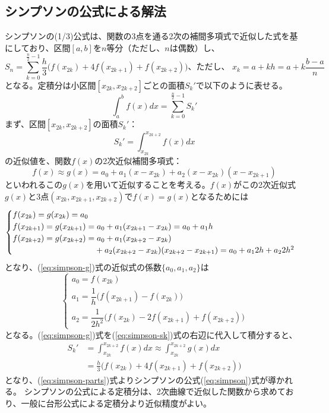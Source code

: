 \documentclass[12pt,a4paper]{ltjsreport}
\begin{document}
\subsection{シンプソンの公式による解法}
シンプソンの(1/3)公式は、関数の3点を通る2次の補間多項式で近似した式を基にしており、区間$[a,b]$を$n$等分（ただし、$n$は偶数）し、
\begin{equation}\label{eq:simpson}
S_n = \sum_{k=0}^{\frac{n}{2}-1}\frac{h}{3}\bigl(f(x_{2k})+4f(x_{2k+1})+f(x_{2k+2})\bigr)\text{、ただし、 } x_k = a+kh = a+k\frac{b-a}{n}
\end{equation}
となる。定積分は小区間$[x_{2k}, x_{2k+2}]$ごとの面積$S_k'$で以下のように表せる。
\begin{equation}\label{eq:simpson-parts}
\int_{a}^{b}f(x)dx = \sum_{k=0}^{\frac{n}{2}-1}S_k'
\end{equation}
まず、区間$[x_{2k}, x_{2k+2}]$の面積$S_k'$：
\begin{equation}\label{eq:simpson-sk}
S_k' = \int_{x_{2k}}^{x_{2k+2}}f(x)dx
\end{equation}
の近似値を、関数$f(x)$の2次近似補間多項式：
\begin{equation}\label{eq:simpson-g}
f(x)\approx g(x) = a_0 + a_1(x-x_{2k}) + a_2(x-x_{2k})(x-x_{2k+1})
\end{equation}
といわれるこの$g(x)$を用いて近似することを考える。$f(x)$がこの2次近似式$g(x)$と3点$(x_{2k}, x_{2k+1}, x_{2k+2})$で$f(x)=g(x)$となるためには
\begin{equation}
\begin{cases}
f(x_{2k}) = g(x_{2k}) = a_0 \\
f(x_{2k+1}) = g(x_{2k+1}) = a_0 + a_1(x_{2k+1}-x_{2k}) = a_0 + a_1 h \\
f(x_{2k+2}) = g(x_{2k+2}) = a_0 + a_1(x_{2k+2}-x_{2k}) \\
\hphantom{f(x_{2k+2}) = g(x_{2k+2}) =}{}+ a_2(x_{2k+2}-x_{2k})(x_{2k+2}-x_{2k+1}) = a_0 + a_1 2h + a_2 2h^2
\end{cases}
\end{equation}
となり、(\ref{eq:simpson-g})式の近似式の係数$\{a_0, a_1, a_2\}$は
\begin{equation}\label{eq:simpson-coeffs}
\begin{cases}
a_0 = f(x_{2k}) \\
a_1 = \dfrac{1}{h}\bigl(f(x_{2k+1}) - f(x_{2k})\bigr) \\
a_2 = \dfrac{1}{2h^2}\bigl(f(x_{2k}) - 2f(x_{2k+1}) + f(x_{2k+2})\bigr)
\end{cases}
\end{equation}
となる。(\ref{eq:simpson-g})式を(\ref{eq:simpson-sk})式の右辺に代入して積分すると、
\begin{equation}
\begin{aligned}
S_k' &= \int_{x_{2k}}^{x_{2k+2}}f(x)dx \approx \int_{x_{2k}}^{x_{2k+2}}g(x)dx \\
&= \frac{h}{3}\bigl(f(x_{2k})+4f(x_{2k+1})+f(x_{2k+2})\bigr)
\end{aligned}
\end{equation}
となり、(\ref{eq:simpson-parts})式よりシンプソンの公式(\ref{eq:simpson})式が導かれる。
シンプソンの公式による定積分は、2次曲線で近似した関数から求めており、一般に台形公式による定積分より近似精度がよい。
\end{document}

